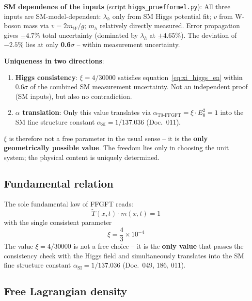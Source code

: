 \textbf{SM dependence of the inputs} (script \texttt{higgs\_pruefformel.py}):
All three inputs are SM-model-dependent: $\lambda_h$ only from SM Higgs
potential fit; $v$ from W-boson mass via $v = 2m_W/g$; $m_h$ relatively
directly measured. Error propagation gives $\pm 4.7\%$ total uncertainty
(dominated by $\lambda_h$ at $\pm 4.65\%$). The deviation of $-2.5\%$
lies at only \textbf{0.6$\sigma$} -- within measurement uncertainty.

\textbf{Uniqueness in two directions}:
\begin{enumerate}
    \item \textbf{Higgs consistency}: $\xi = 4/30000$ satisfies
          equation~\eqref{eq:xi_higgs_en} within $0.6\sigma$ of the
          combined SM measurement uncertainty. Not an independent proof
          (SM inputs), but also no contradiction.
    \item \textbf{$\alpha$ translation}: Only this value translates
          via $\alpha_{\text{T0-FFGFT}} = \xi \cdot E_0^2 = 1$ into the
          SM fine structure constant
          $\alpha_{\text{SI}} = 1/137.036$ (Doc.~011).
\end{enumerate}

$\xi$ is therefore not a free parameter in the usual sense -- it is
the \textbf{only geometrically possible value}. The freedom lies
only in choosing the unit system; the physical content is uniquely
determined.

\subsection{Fundamental relation}

The sole fundamental law of FFGFT reads:
\begin{equation}
    \tilde{T}(x,t) \cdot m(x,t) = 1
    \label{eq:fundamental}
\end{equation}
with the single consistent parameter
\begin{equation}
    \xi = \frac{4}{3} \times 10^{-4}
\end{equation}
The value $\xi = 4/30000$ is not a free choice -- it is the
\textbf{only value} that passes the consistency check with the
Higgs field and simultaneously translates into the SM fine
structure constant $\alpha_{\text{SI}} = 1/137.036$
(Doc.~049, 186, 011).

\subsection{Free Lagrangian density}

